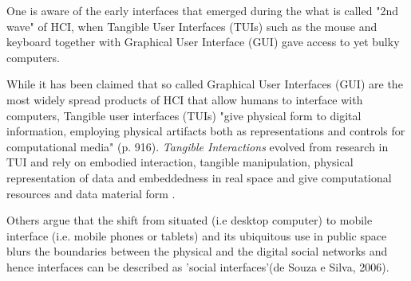 






One is aware of the early interfaces that emerged during the what is called "2nd wave" of HCI, when Tangible User Interfaces (TUIs) such as the mouse and keyboard together with Graphical User Interface (GUI) gave access to yet bulky computers. 

While it has been claimed that so called Graphical User Interfaces (GUI) are the most widely spread products of HCI that allow humans to interface with computers,  Tangible user interfaces (TUIs) "give physical form to digital information, employing physical artifacts both as representations and controls for computational media" \cite{Ullmer_2000}(p. 916). 
\textit{Tangible Interactions} evolved from research in TUI and rely on embodied interaction, tangible manipulation, physical representation of data and embeddedness in real space and give computational resources and data material form \cite{Hornecker_2006}. 

Others argue that the shift from situated (i.e desktop computer) to mobile interface (i.e. mobile phones or tablets) and its ubiquitous use in public space blurs the boundaries between the physical and the digital social networks and hence interfaces can be described as 'social interfaces'(de Souza e Silva, 2006).  


